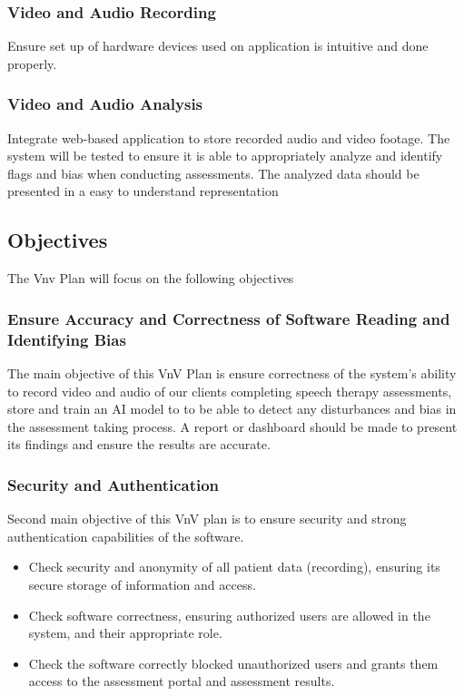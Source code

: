 \documentclass[12pt, titlepage]{article}
\begin{document}
  \subsubsection{Video and Audio Recording}

  Ensure set up of hardware devices used on application is intuitive and done properly. 

  \subsubsection{Video and Audio Analysis}

  Integrate web-based application to store recorded audio and video footage. The system will be tested to ensure it is able to 
  appropriately analyze and identify flags and bias when conducting assessments. The analyzed data should be presented 
  in a easy to understand representation

\subsection{Objectives}


The Vnv Plan will focus on the following objectives
\subsubsection{Ensure Accuracy and Correctness of Software Reading and Identifying Bias}
The main objective of this VnV Plan is ensure correctness of the system's ability to 
record video and audio of our clients completing speech therapy assessments, store and train an AI model to 
to be able to detect any disturbances and bias in the assessment taking process. A report or dashboard should be made to present its findings and ensure the results are accurate.


\subsubsection{Security and Authentication}

Second main objective of this VnV plan is to ensure security and strong authentication capabilities of the software. 
\begin{itemize}
  \item Check security and anonymity of all patient data (recording), ensuring its secure storage of information and access.
  \item Check software correctness, ensuring authorized users are allowed in the system, and their appropriate role. 
  \item Check the software correctly blocked unauthorized users and grants them access to the assessment portal and assessment results.
\end{itemize}
\end{document}
